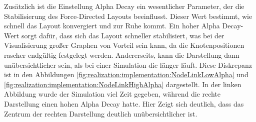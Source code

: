 Zusätzlich ist die Einstellung Alpha Decay ein wesentlicher Parameter, der die Stabilisierung des Force-Directed Layouts beeinflusst. Dieser Wert bestimmt, wie schnell das Layout konvergiert und zur Ruhe kommt. Ein hoher Alpha Decay-Wert sorgt dafür, dass sich das Layout schneller stabilisiert, was bei der Visualisierung großer Graphen von Vorteil sein kann, da die Knotenpositionen rascher endgültig festgelegt werden. Andererseits, kann die Darstellung dann unübersichtlicher sein, als bei einer Simulation die länger läuft. Diese Diskrepanz ist in den Abbildungen \ref{fig:realization:implementation:NodeLinkLowAlpha} und \ref{fig:realization:implementation:NodeLinkHighAlpha} dargestellt. In der linken Abbildung wurde der Simulation viel Zeit gegeben, während die rechte Darstellung einen hohen Alpha Decay hatte. Hier Zeigt sich deutlich, dass das Zentrum der rechten Darstellung deutlich unübersichtlicher ist.


